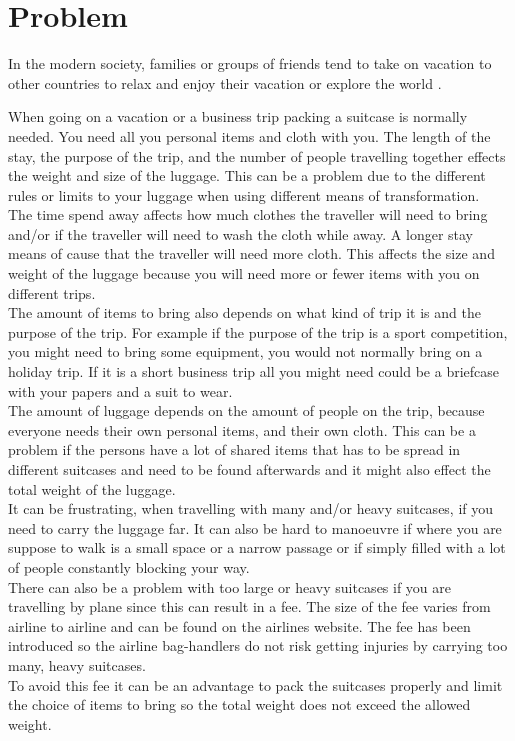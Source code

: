 \section{Problem}
In the modern society, families or groups of friends tend to take on vacation to other countries to relax and enjoy their vacation or explore the world \citep{danskecharter}.

When going on a vacation or a business trip packing a suitcase is normally needed. You need all you personal items and cloth with you. The length of the stay, the purpose of the trip, and the number of people travelling together effects the weight and size of the luggage. This can be a problem due to the different rules or limits to your luggage when using different means of transformation.\\

The time spend away affects how much clothes the traveller will need to bring and/or if the traveller will need to wash the cloth while away. A longer stay means of cause that the traveller will need more cloth. This affects the size and weight of the luggage because you will need more or fewer items with you on different trips.\\
 
The amount of items to bring also depends on what kind of trip it is and the purpose of the trip. For example if the purpose of the trip is a sport competition, you might need to bring some equipment, you would not normally bring on a holiday trip. If it is a short business trip all you might need could be a briefcase with your papers and a suit to wear.\\

The amount of luggage depends on the amount of people on the trip, because everyone needs their own personal items, and their own cloth. This can be a problem if the persons have a lot of shared items that has to be spread in different suitcases and need to be found afterwards and it might also effect the total weight of the luggage.\\

It can be frustrating, when travelling with many and/or heavy suitcases, if you need to carry the luggage far. It can also be hard to manoeuvre if where you are suppose to walk is a small space or a narrow passage or if simply filled with a lot of people constantly blocking your way.\\
 
There can also be a problem with too large or heavy suitcases if you are travelling by plane since this can result in a fee. The size of the fee varies from airline to airline and can be found on the airlines website\citep{altombag}. The fee has been introduced so the airline bag-handlers do not risk getting injuries by carrying too many, heavy suitcases.\\ 
To avoid this fee it can be an advantage to pack the suitcases properly and limit the choice of items to bring so the total weight does not exceed the allowed weight.\\

